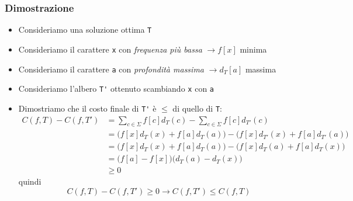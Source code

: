 \subsubsection{Dimostrazione}
\begin{itemize}
	\item Consideriamo una soluzione ottima \verb|T|
	\item Consideriamo il carattere \verb|x| con \textit{frequenza più bassa} $ \rightarrow f\left[x\right] $ minima
	\item Consideriamo il carattere \verb|a| con \textit{profondità massima} $ \rightarrow d_T\left[a\right] $ massima
	\item Consideriamo l'albero \verb|T'| ottenuto scambiando \verb|x| con \verb|a|
	\item Dimostriamo che il costo finale di \verb|T'| è $ \le $ di quello di \verb|T|:
	      \begin{align*}
		      C(f, T) - C(f, T') & = \sum_{c \in \Sigma} f[c] d_T(c) - \sum_{c \in \Sigma} f[c] d_{T'}(c)            \\
		                         & = \big(f[x] d_T(x) + f[a] d_T(a)\big) - \big(f[x] d_{T'}(x) + f[a] d_{T'}(a)\big) \\
		                         & = \big(f[x] d_T(x) + f[a] d_T(a)\big) - \big(f[x] d_T(a) + f[a] d_T(x)\big)       \\
		                         & = \big(f[a] - f[x]\big) \big(d_T(a) - d_T(x)\big)                                 \\
		                         & \geq 0
	      \end{align*}
	      quindi
	      \[
		      C(f, T) - C(f, T') \ge 0 \rightarrow  C(f, T') \le C(f, T)
	      \]
\end{itemize}
